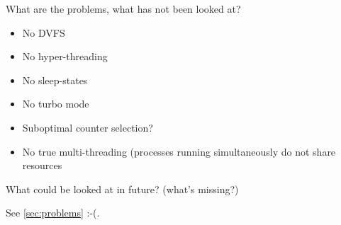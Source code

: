 

\label{sec:problems}

What are the problems, what has not been looked at?

\begin{itemize}

\item No DVFS

\item No hyper-threading

\item No sleep-states

\item No turbo mode

\item Suboptimal counter selection?

\item No true multi-threading (processes running simultaneously do not share
resources

\end{itemize}


\label{sec:outlook}

What could be looked at in future? (what's missing?)

See \ref{sec:problems} :-(.
